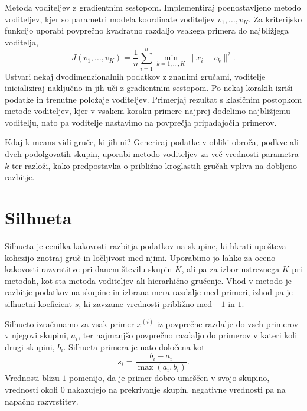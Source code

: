 \begin{exercise}{Metoda voditeljev z gradientnim sestopom.}
  Implementiraj poenostavljeno metodo voditeljev, kjer so parametri modela koordinate voditeljev \(v_1,\ldots,v_K\). Za kriterijsko funkcijo uporabi povprečno kvadratno razdaljo vsakega primera do najbližjega voditelja,
  \[
  J(v_1,\ldots,v_K)=
  \frac{1}{n}\sum_{i=1}^n \min_{k=1,\ldots,K}\|x_i-v_k\|^2 .
  \]
  Ustvari nekaj dvodimenzionalnih podatkov z znanimi gručami, voditelje inicializiraj naključno in jih uči z gradientnim sestopom. Po nekaj korakih izriši podatke in trenutne položaje voditeljev.   Primerjaj rezultat s klasičnim postopkom metode voditeljev, kjer v vsakem koraku primere najprej dodelimo najbližjemu voditelju, nato pa voditelje nastavimo na povprečja pripadajočih primerov.
\end{exercise}

\begin{exercise}{Kdaj k-means vidi gruče, ki jih ni?}
Generiraj podatke v obliki obroča, podkve ali dveh podolgovatih skupin, uporabi metodo voditeljev za več vrednosti parametra $k$ ter razloži, kako predpostavka o približno kroglastih gručah vpliva na dobljeno razbitje.
\end{exercise}

\section{Silhueta}
Silhueta je cenilka kakovosti razbitja podatkov na skupine, ki hkrati upošteva kohezijo znotraj gruč in ločljivost med njimi. 
%
%
Uporabimo jo lahko za oceno kakovosti razvrstitve pri danem številu skupin $K$, ali pa za izbor ustreznega $K$ pri metodah, kot sta metoda voditeljev ali hierarhično gručenje. Vhod v metodo je razbitje podatkov na skupine in izbrana mera razdalje med primeri, izhod pa je silhuetni koeficient $s$, ki zavzame vrednosti približno med $-1$ in $1$.

Silhueto izračunamo za vsak primer $x^{(i)}$ iz povprečne razdalje do vseh primerov v njegovi skupini, $a_i$, ter najmanjšo povprečno razdaljo do primerov v kateri koli drugi skupini, $b_i$. Silhueta primera je nato določena kot
\[
s_i = \frac{b_i - a_i}{\max(a_i, b_i)}.
\]
Vrednosti blizu $1$ pomenijo, da je primer dobro umeščen v svojo skupino, vrednosti okoli $0$ nakazujejo na prekrivanje skupin, negativne vrednosti pa na napačno razvrstitev.

